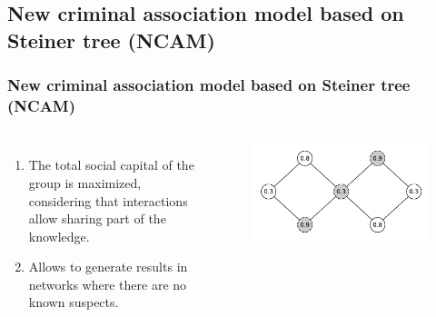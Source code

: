 \documentclass[aspectratio=169]{beamer}
\begin{document}
\subsection{New criminal association model based on Steiner tree (NCAM)}
\begin{frame}
\frametitle{New criminal association model based on Steiner tree (NCAM)}
  \begin{columns}
    \begin{enumerate}
      \item<1-> The total social capital of the group is maximized, considering that interactions allow sharing part of the knowledge.
      \item<2-> Allows to generate results in networks where there are no known suspects.
    \end{enumerate}
    \begin{figure}[ht]
      \centering
      \includegraphics[width=\textwidth]{images/ncam.pdf}
    \end{figure}
  \end{columns}
\end{frame}
\end{document}
